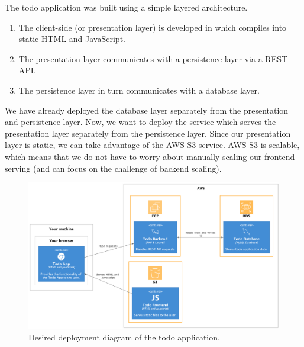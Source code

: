 \documentclass{csse4400}
\begin{document}
The todo application was built using a simple layered architecture.
\begin{enumerate}
  \item The client-side (or presentation layer) is developed in  which compiles into static HTML and JavaScript.
  \item The presentation layer communicates with a  persistence layer via a REST API.
  \item The persistence layer in turn communicates with a  database layer.
\end{enumerate}

We have already deployed the database layer separately from the presentation and persistence layer.
Now, we want to deploy the service which serves the presentation layer separately from the persistence layer.
Since our presentation layer is static,
we can take advantage of the AWS S3 service.
AWS S3 is scalable, which means that we do not have to worry about manually scaling our frontend serving (and can focus on the challenge of backend scaling).

\begin{figure}[ht]
\includegraphics[width=\textwidth]{diagrams/deployment}
\caption{Desired deployment diagram of the todo application.}
\end{figure}



\end{document}
